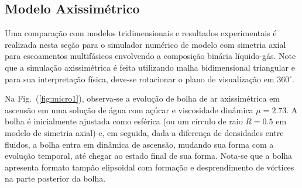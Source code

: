 \documentclass[a4paper,portuges,12pt]{article}
\begin{document}
\subsection{Modelo Axissimétrico}

Uma comparação com modelos tridimensionais e resultados experimentais é
realizada nesta seção para o simulador numérico de modelo com simetria
axial para escoamentos multifásicos envolvendo a composição binária
líquido-gás. Note que a simulação axissimétrica é feita utilizando malha
bidimensional triangular e para sua interpretação física, deve-se
rotacionar o plano de visualização em $360^\circ$.

Na Fig.~(\ref{fig:micro1}), observa-se a evolução de bolha de ar
axissimétrica em ascensão em uma solução de água com açúcar e
viscosidade dinâmica $\mu=2.73$. A bolha é inicialmente ajustada como
esférica (ou um círculo de raio $R=0.5$ em modelo de simetria axial) e,
em seguida, dada a diferença de densidades entre fluidos, a bolha entra
em dinâmica de ascensão, mudando sua forma com a evolução temporal, até
chegar ao estado final de sua forma. Nota-se que a bolha apresenta
formato tampão elipsoidal com formação e desprendimento de vórtices na
parte posterior da bolha.
\end{document}
